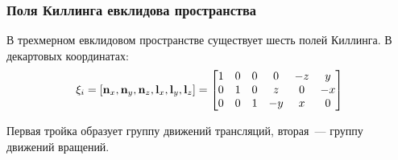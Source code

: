 \documentclass{beamer}
\begin{document}

    \begin{frame}\frametitle{Поля Киллинга евклидова пространства}

        В трехмерном евклидовом пространстве существует шесть полей Киллинга. В декартовых координатах:
        \begin{equation}
            \mathbf{\xi}_i
            =
            \left[
                \mathbf{n}_x, \mathbf{n}_y, \mathbf{n}_z,
                \mathbf{l}_x, \mathbf{l}_y, \mathbf{l}_z
            \right]
            =
            \begin{bmatrix}
                1 & 0 & 0 & 0  & -z & y  \\
                0 & 1 & 0 & z  & 0  & -x \\
                0 & 0 & 1 & -y & x  & 0
            \end{bmatrix}
        \end{equation}

        Первая тройка образует группу движений трансляций, вторая~--- группу движений вращений.

    \end{frame}

\end{document}
